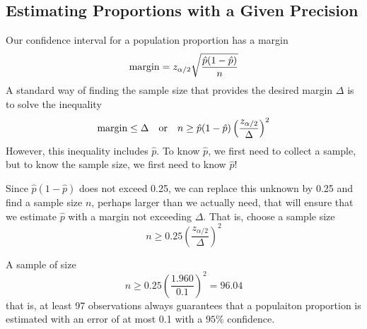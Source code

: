 \subsection{Estimating Proportions with a Given Precision}
\label{subsec:est-propor-given-precision}

Our confidence interval for a population proportion has a margin
\begin{equation*}
  \textnormal{margin} = z_{\alpha/2} \sqrt{\frac{\hat{p} (1 - \hat{p})}{n}}
\end{equation*}
A standard way of finding the sample size that provides the desired margin $\Delta$ is to solve the inequality
\begin{align*}
  \textnormal{margin} \leq \Delta &&\textnormal{or}&& n \geq \hat{p} (1 - \hat{p}) \left( \frac{z_{\alpha/2}}{\Delta} \right)^2
\end{align*}
However, this inequality includes $\hat{p}$. To know $\hat{p}$, we first need to collect a sample, but to know the sample size, we first need to know $\hat{p}$!

Since $\hat{p} (1 - \hat{p})$ does not exceed 0.25, we can replace this unknown by 0.25 and find a sample size $n$, perhaps larger than we actually need, that will ensure that we estimate $\hat{p}$ with a margin not exceeding $\Delta$. That is, choose a sample size
\begin{equation*}
  n \geq 0.25 \left( \frac{z_{\alpha / 2}}{\Delta} \right)^2
\end{equation*}

\begin{example}{}
  A sample of size
  \begin{equation*}
    n \geq 0.25 \left( \frac{1.960}{0.1} \right)^2 = 96.04
  \end{equation*}
  that is, at least 97 observations always guarantees that a populaiton proportion is estimated with an error of at most 0.1 with a $95\%$ confidence.
\end{example}
